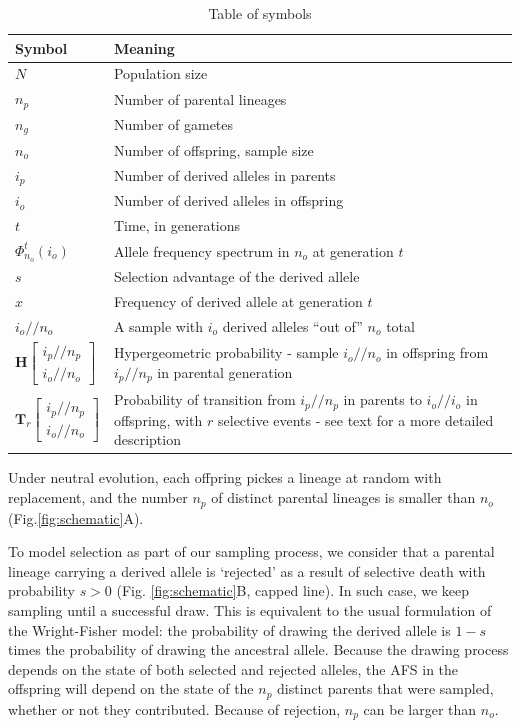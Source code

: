 \documentclass[review]{elsarticle}
\newcommand{\dslash}{/\!\!/}
\newcommand{\Coalc}[4]{\begin{bmatrix}#1\dslash #2 \\ #3\dslash #4 \end{bmatrix}}
\begin{document}
\begin{table}
  \centering
  \begin{tabular}{l|p{100mm}}
    Symbol & Meaning\\
    \hline
    $N$ & Population size\\
    $n_p$ & Number of parental lineages\\
    $n_g$ & Number of gametes\\
    $n_o$ & Number of offspring, sample size\\
    $i_p$ & Number of derived alleles in parents\\
    $i_o$ & Number of derived alleles in offspring\\
    $t$ & Time, in generations\\
    $\Phi_{n_o}^{t}(i_o)$ & Allele frequency spectrum in $n_o$ at generation $t$\\
    $s$ & Selection advantage of the derived allele\\
    $x$ & Frequency of derived allele at generation $t$\\
    $i_o \dslash n_o$ & A sample with $i_o$ derived alleles ``out of'' $n_o$ total\\
    $\mathbf{H}\Coalc{i_p}{n_p}{i_o}{n_o}$ & Hypergeometric probability -
                                             sample $i_o \dslash n_o$ in offspring from $i_p \dslash n_p$ in parental generation\\
    $\mathbf{T}_{r}\Coalc{i_p}{n_p}{i_o}{n_o}$ & Probability of transition from $i_p \dslash n_p$ in parents
                                                 to $i_o \dslash i_o$ in offspring, with $r$ selective events -
                                                 see text for a more detailed description\\
  \end{tabular}
  \caption{\label{tab:symbols} Table of symbols}
\end{table}

Under neutral evolution, each offpring pickes a lineage at random with replacement, and the number $n_p$ of distinct parental lineages is smaller than
$n_o$  (Fig.\ref{fig:schematic}A). 


To model selection as part of our sampling process, we consider that a parental lineage carrying a derived allele 
is `rejected' as a result of selective death with probability $s>0$
(Fig. \ref{fig:schematic}B, capped line). In such case, we keep sampling until a successful draw.  
This is equivalent to the usual formulation of the Wright-Fisher model: the probability of drawing 
the derived allele is $1-s$ times the probability of drawing the ancestral allele. 
Because the drawing process depends on the state of both selected and rejected alleles, 
the AFS in the offspring will depend on the state of the $n_p$ distinct parents that were sampled,
whether or not they contributed. Because of rejection, $n_p$ can be larger than $n_o.$
\end{document}
